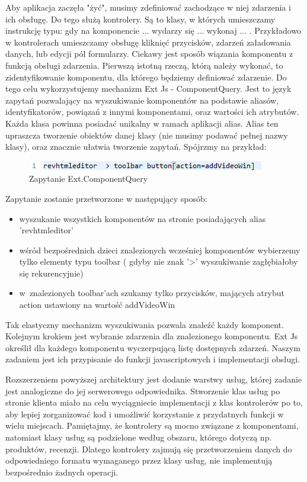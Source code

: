 Aby aplikacja zaczęła "żyć", musimy zdefiniować zachodzące w niej zdarzenia i ich obsługę. Do tego służą kontrolery. Są to klasy, w których umieszczamy instrukcję typu: gdy na komponencie ... wydarzy się ... wykonaj ... . Przykładowo w kontrolerach umieszczamy obsługę kliknięć przycisków, zdarzeń załadowania danych, lub edycji pól formularzy. Ciekawy jest sposób wiązania komponentu z funkcją obsługi zdarzenia. Pierwszą istotną rzeczą, którą należy wykonać, to zidentyfikowanie komponentu, dla którego będziemy definiować zdarzenie. Do tego celu wykorzystujemy mechanizm Ext Js - ComponentQuery. Jest to język zapytań pozwalający na wyszukiwanie komponentów na podstawie aliasów, identyfikatorów, powiązań z innymi komponentami, oraz wartości ich atrybutów. Każda klasa powinna posiadać unikalny w ramach aplikacji alias. Alias ten upraszcza tworzenie obiektów danej klasy (nie musimy podawać pełnej nazwy klasy), oraz znacznie ułatwia tworzenie zapytań. Spójrzmy na przykład: 

\begin{figure}[H]
	\centering
	\includegraphics[width=\textwidth]{images/cmp_query.png}
	\caption{Zapytanie Ext.ComponentQuery}
\end{figure}

Zapytanie zostanie przetworzone w następujący sposób:

\begin{itemize}
\item wyszukanie wszystkich komponentów na stronie posiadających alias 'revhtmleditor'
\item wśród bezpośrednich dzieci znalezionych wcześniej komponentów wybierzemy tylko elementy typu toolbar ( gdyby nie znak '>' wyszukiwanie zagłębiałoby się rekurencyjnie)
\item w~znalezionych toolbar'ach szukamy tylko przycisków, mających atrybut action ustawiony na wartość addVideoWin
\end{itemize}

Tak elastyczny mechanizm wyszukiwania pozwala znaleźć każdy komponent.
Kolejnym krokiem jest wybranie zdarzenia dla znalezionego komponentu. Ext Js określił dla każdego komponentu wyczerpującą listę dostępnych zdarzeń. Naszym zadaniem jest ich przypisanie do funkcji javascriptowych i implementacji obsługi.

Rozszerzeniem powyższej architektury jest dodanie warstwy usług, której zadanie jest analogiczne do jej serwerowego odpowiednika. Stworzenie klas usług po stronie klienta miało na celu wyciągniecie implementacji z klas kontrolerów po to, aby lepiej zorganizować kod i umożliwić korzystanie z przydatnych funkcji w wielu miejscach. Pamiętajmy, że kontrolery są mocno związane z komponentami, natomiast klasy usług są podzielone według obszaru, którego dotyczą np. produktów, recenzji. Dlatego kontrolery zajmują się przetworzeniem danych do odpowiedniego formatu wymaganego przez klasy usług, nie implementują bezpośrednio żadnych operacji.




